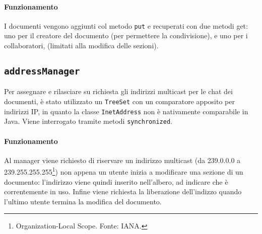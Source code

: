 \paragraph{Funzionamento}
I documenti vengono aggiunti col metodo \texttt{put} e recuperati con due metodi get: uno per il creatore del documento (per permettere la condivisione), e uno per i collaboratori, (limitati alla modifica delle sezioni).

\subsection{\texttt{addressManager}}
Per assegnare e rilasciare su richiesta gli indirizzi multicast per le chat dei documenti, è stato utilizzato un \texttt{TreeSet} con un comparatore apposito per indirizzi IP, in quanto la classe \texttt{InetAddress} non è nativamente comparabile in Java. Viene interrogato tramite metodi \texttt{synchronized}.

\paragraph{Funzionamento}
Al manager viene richiesto di riservare un indirizzo multicast (da 239.0.0.0 a 239.255.255.255\footnote{Organization-Local Scope. Fonte: IANA.}) non appena un utente inizia a modificare una sezione di un documento: l'indirizzo viene quindi inserito nell'albero, ad indicare che è correntemente in uso. Infine viene richiesta la liberazione dell'indizzo quando l'ultimo utente termina la modifica del documento.
